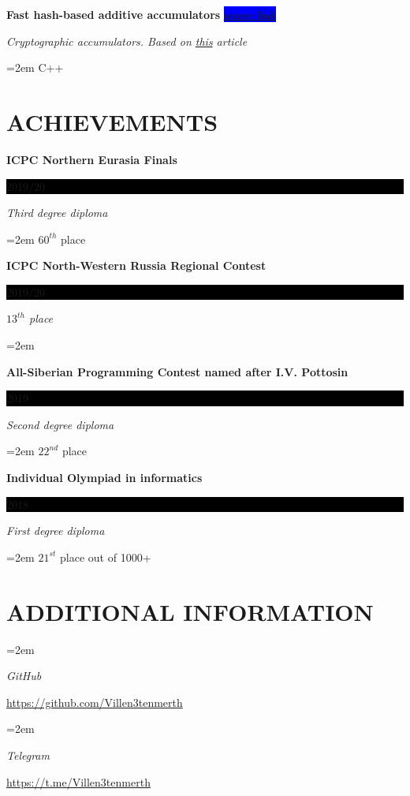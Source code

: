 \documentclass[paper=a4,fontsize=11pt]{scrartcl} %
\newlength{\spacebox}
\newcommand{\sepspace}{\vspace*{1em}}		%
\newcommand{\NewPart}[1]{\section*{\uppercase{#1}}}
\newcommand{\PersonalEntry}[2]{
		\noindent\hangindent=2em\hangafter=0 %
		\parbox{\spacebox}{        %
		\textit{#1}}		       %
		\hspace{1.5em} #2 \par}    %
\newcommand{\SkillsEntry}[2]{      %
		\noindent\hangindent=2em\hangafter=0 %
		\parbox{\spacebox}{        %
		\textit{#1}}			   %
		\hspace{1.5em} #2 \par}    %
\newcommand{\EducationEntry}[4]{
		\noindent \textbf{#1} \hfill      %
		\colorbox{Black}{%
			\parbox{6em}{%
			\hfill\color{White}#2}} \par  %
		\noindent \textit{#3} \par        %
		\noindent\hangindent=2em\hangafter=0 \small #4 %
		\normalsize \par}
\newcommand{\WorkEntry}[4]{				  %
		\noindent \textbf{#1} \hfill      %
		\colorbox{Blue}{\color{White}#2} \par  %
		\noindent \textit{#3} \par              %
		\noindent\hangindent=2em\hangafter=0 \small #4 %
		\normalsize \par}
\begin{document}
\WorkEntry{Fast hash-based additive accumulators}{\href{https://github.com/IvanMaslov/AdditiveAccumulator}{source link}}{Cryptographic accumulators. Based on \href{https://github.com/bigspider/accumulator/blob/master/docs/paper-draft.pdf}{this} article}{C++}
\sepspace

\NewPart{Achievements}{}

\EducationEntry{ICPC Northern Eurasia Finals}{2019/20}{Third degree diploma}{$60^{th}$ place}
\sepspace

\EducationEntry{ICPC North-Western Russia Regional Contest}{2019/20}{$13^{th}$ place}
\sepspace

\EducationEntry{All-Siberian Programming Contest named after I.V. Pottosin}{2019}{Second degree diploma}{$22^{nd}$ place}
\sepspace

\EducationEntry{Individual Olympiad in informatics}{2018}{First degree diploma}{$21^{st}$ place out of 1000+}
\sepspace

\NewPart{Additional information}{}

\SkillsEntry{GitHub}{\href{https://github.com/Villen3tenmerth}{https://github.com/Villen3tenmerth} }
\sepspace

\SkillsEntry{Telegram}{\href{https://t.me/Villen3tenmerth}{https://t.me/Villen3tenmerth} }
\end{document}
